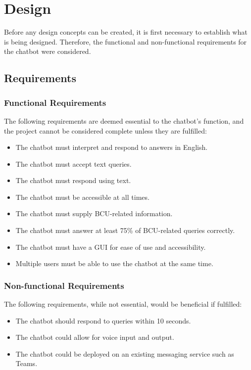 \section{Design}
Before any design concepts can be created, it is first necessary to establish what is being designed. Therefore, the functional and 
non-functional requirements for the chatbot were considered.

\subsection{Requirements}
\subsubsection{Functional Requirements}
The following requirements are deemed essential to the chatbot's function, and the project cannot be considered complete unless they 
are fulfilled:

\begin{itemize}
    \item The chatbot must interpret and respond to answers in English.
    \item The chatbot must accept text queries.
    \item The chatbot must respond using text.
    \item The chatbot must be accessible at all times.
    \item The chatbot must supply BCU-related information.
    \item The chatbot must answer at least 75\% of BCU-related queries correctly.
    \item The chatbot must have a GUI for ease of use and accessibility.
    \item Multiple users must be able to use the chatbot at the same time.
\end{itemize}

\subsubsection{Non-functional Requirements}
The following requirements, while not essential, would be beneficial if fulfilled:

\begin{itemize}
    \item The chatbot should respond to queries within 10 seconds.
    \item The chatbot could allow for voice input and output.
    \item The chatbot could be deployed on an existing messaging service such as Teams.
\end{itemize}


